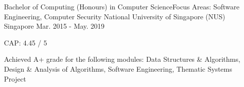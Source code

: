 

\begin{cventries}

  \cventry
    {Bachelor of Computing (Honours) in Computer Science\linebreak Focus Areas: Software Engineering, Computer Security} %
    {National University of Singapore (NUS)} %
    {Singapore} %
    {Mar. 2015 - May. 2019} %
    {
      \begin{cvitems} %
        \item {CAP: 4.45 / 5}
        \item {Achieved A+ grade for the following modules: Data Structures \& Algorithms, Design \& Analysis of Algorithms, Software Engineering, Thematic Systems Project}
      \end{cvitems}
    }

\end{cventries}
